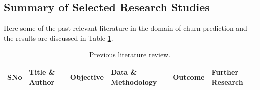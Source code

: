 \begin{landscape}
\section{Summary of Selected Research Studies}
Here some of the past relevant literature in the domain of churn prediction and the results are discussed in Table \ref{table1}.

\begin{longtable}{ | p{20pt} | p{100pt} | p{100pt} | p{150pt} | p{100pt} | p{150pt} | }
	\caption{Previous literature review.}\label{table1}\\
 	
 	\hline
 	SNo & Title \& Author & Objective &  Data \& Methodology & Outcome & Further Research\\
 	\hline
 	\endfirsthead
 	

\end{longtable}
\end{landscape}
